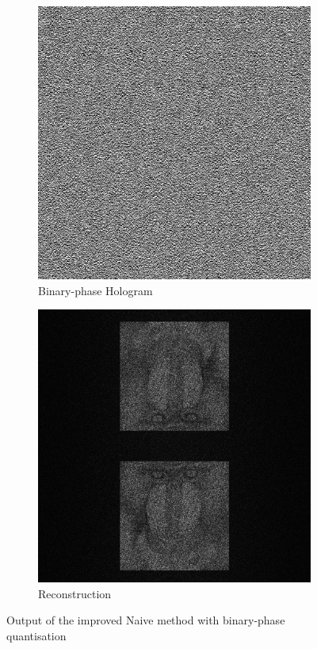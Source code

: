 \begin{figure}[H]
\begin{subfigure}[t]{0.3\textwidth}
    \includegraphics[width=\textwidth]{Naive_binary_Holo.png}
    \caption{Binary-phase Hologram}
    \label{fig:Naive_binary_Holo}
  \end{subfigure}
  \hfill
  \begin{subfigure}[t]{0.3\textwidth}
    \centering
    \includegraphics[width=\textwidth]{Naive_binary_Recon.jpg}
    \caption{Reconstruction}
    \label{fig:Naive_binary_Recon}
  \end{subfigure}
  \caption{Output of the improved Naive method with binary-phase quantisation}
  \label{fig:Output of the improved Naive method with binary-phase quantisation}
\end{figure}

